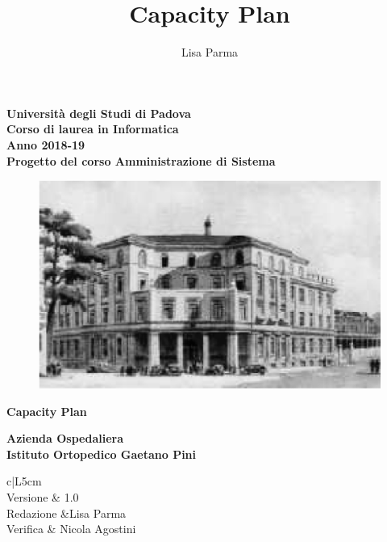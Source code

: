 \documentclass[a4paper, oneside, openany,12pt]{article}
\title{\textbf{Capacity Plan}}
\author{Lisa Parma}
\begin{document}
	
\begin{titlepage}
	\begin{center}
	
		\textbf{Università degli Studi di Padova \\ Corso di laurea in Informatica \\ Anno 2018-19 \\}
		\textbf{Progetto del corso Amministrazione di Sistema}
		\vspace{1cm}
		\begin{center}
			\begin{figure}[h!]
				\centering
				\includegraphics[width=0.5\linewidth]{./img/logo.jpg}
			\end{figure}
			\begin{Huge}
				\textbf{Capacity Plan} \\
			\end{Huge}
			\begin{Large}
				\textbf{Azienda Ospedaliera} \\
				\textbf{Istituto Ortopedico Gaetano Pini} \\
			\end{Large}
		\vspace{3cm}
	\centering
	\begin{tabular}{c|L{5cm}}
		 \\ \hline
		Versione &  1.0\\
		Redazione &Lisa Parma \\
		Verifica & Nicola Agostini \\
	\end{tabular}
		
	\end{center}
	\end{center}
\end{titlepage}

\tableofcontents
{}
{}
\listoftables

\end{document}
